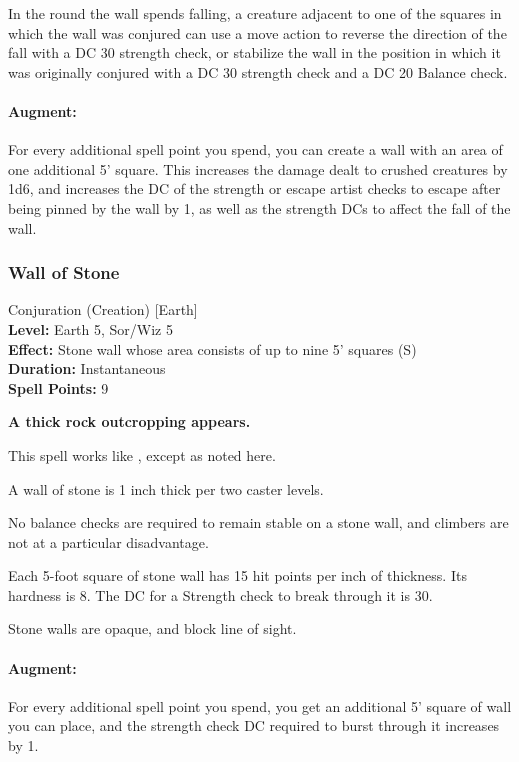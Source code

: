 In the round the wall spends falling, a creature adjacent to one of the squares in which the wall was conjured can use a move action 
to reverse the direction of the fall with a DC 30 strength check, 
or stabilize the wall in the position in which it was originally conjured with a DC 30 strength check and a DC 20 Balance check.

\paragraph{Augment:} For every additional spell point you spend, you can create a wall with an area of one additional 5' square. This increases the
damage dealt to crushed creatures by 1d6, and increases the DC of the strength or escape artist checks to escape after being pinned by the wall by 1, 
as well as the strength DCs to affect the fall of the wall.
\subsubsection{Wall of Stone}
\label{Spell:WallOfStone}
Conjuration (Creation) [Earth]
\\ \textbf{Level:} Earth 5, Sor/Wiz 5
\\ \textbf{Effect:} Stone wall whose area consists of up to nine 5' squares (S)
\\ \textbf{Duration:} Instantaneous
\\ \textbf{Spell Points:} 9

\textbf{A thick rock outcropping appears.}

This spell works like , except as noted here.

\begin{list}{}{\leftmargin=1em}
 \item A wall of stone is 1 inch thick per two caster levels.
 \item No balance checks are required to remain stable on a stone wall, and climbers are not at a particular disadvantage.
 \item Each 5-foot square of stone wall has 15 hit points per inch of thickness. Its hardness is 8.
The DC for a Strength check to break through it is 30.
 \item Stone walls are opaque, and block line of sight.
\end{list}

\paragraph{Augment:} For every additional spell point you spend, you get an additional 5' square of wall you can place, 
and the strength check DC required to burst through it increases by 1.
